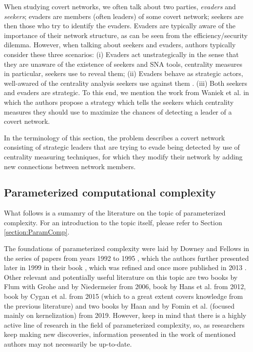 When studying covert networks, we often talk about two parties, \emph{evaders} and \emph{seekers};
evaders are members (often leaders) of some covert network;
seekers are then those who try to identify the evaders.
Evaders are typically aware of the importance of their network structure, as can be seen from
the efficiency/security dilemma.
However, when talking about seekers and evaders, authors typically consider these three scenarios:
(i) Evaders act unstrategically in the sense that they are unaware of
the existence of seekers and SNA tools, centrality measures in particular, seekers use to reveal them;
(ii) Evaders behave as strategic actors, well-awared of the centrality analysis seekers use against them \cite{Waniek2017,Dey2019,Dey2020}.
(iii) Both seekers and evaders are strategic.
To this end, we mention the work from Waniek et al. \cite[y.~2021]{Waniek2021} in which the authors propose
a strategy which tells the seekers which centrality measures they should use to maximize the chances of detecting
a leader of a covert network.

In the terminology of this section, the \HL problem describes a covert network consisting of strategic leaders
that are trying to evade being detected by use of centrality measuring techniques,
for which they modify their network by adding new connections between network members. 

\subsection{Parameterized computational complexity}

What follows is a sumamry of the literature on the topic of parameterized complexity.
For an introduction to the topic itself, please refer to Section \ref{section:ParamComp}.

The foundations of parameterized complexity were laid by Downey and Fellows
in the series of papers from years 1992 to 1995 \cite{Downey1992,Downey1995.1,Downey1995.2,Downey1993,Downey1995.4},
which the authors further presented later in 1999 in their book \cite{Downey1999},
which was refined and once more published in 2013 \cite{Downey2013}.
Other relevant and potentially useful literature on this topic are
two books by Flum with Grohe \cite{Flum2006} and by Niedermeier \cite{Niedermeier2006} from 2006, book by Hans et al. \cite{Hans2012} from 2012,
book by Cygan et al. \cite{Cygan2015} from 2015 (which to a great extent covers knowledge from the previous literature)
and two books by Haan \cite{Haan2019} and by Fomin et al. (focused mainly on kernelization) \cite{Fomin2019} from 2019.
However, keep in mind that there is a highly active line of research in the field of parameterized complexity, so,
as researchers keep making new discoveries, information presented in the work of mentioned authors may not necessarily be up-to-date.
